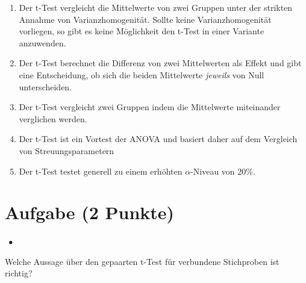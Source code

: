 \documentclass[a4paper, 9pt]{scrartcl}\usepackage[]{graphicx}\usepackage[]{xcolor}
\begin{document}
\begin{enumerate}
\item [\textbf{A} \msquare] Der t-Test vergleicht die Mittelwerte von zwei Gruppen unter der strikten Annahme von Varianzhomogenität. Sollte keine Varianzhomogenität vorliegen, so gibt es keine Möglichkeit den t-Test in einer Variante anzuwenden.
\item [\textbf{B} \msquare] Der t-Test berechnet die Differenz von zwei Mittelwerten als Effekt und gibt eine Entscheidung, ob sich die beiden Mittelwerte \textit{jeweils} von Null unterscheiden.
\item [\textbf{C} \msquare] Der t-Test vergleicht zwei Gruppen indem die Mittelwerte miteinander verglichen werden.
\item [\textbf{D} \msquare] Der t-Test ist ein Vortest der ANOVA und basiert daher auf dem Vergleich von Streuungsparametern
\item [\textbf{E} \msquare] Der t-Test testet generell zu einem erhöhten $\alpha$-Niveau von 20\%.
\end{enumerate}

\section{Aufgabe \hfill (2 Punkte)}

\ifcollection
\begin{flushright}
\tiny\vspace{-2Ex}
\textbf{\examinhaltstart}
\exammodulestatversuch $\;\bullet$
\exammodulebiostat
\vspace{-1Ex}
\end{flushright}
\fi





Welche Aussage über den gepaarten t-Test für verbundene Stichproben ist richtig?
\end{document}
